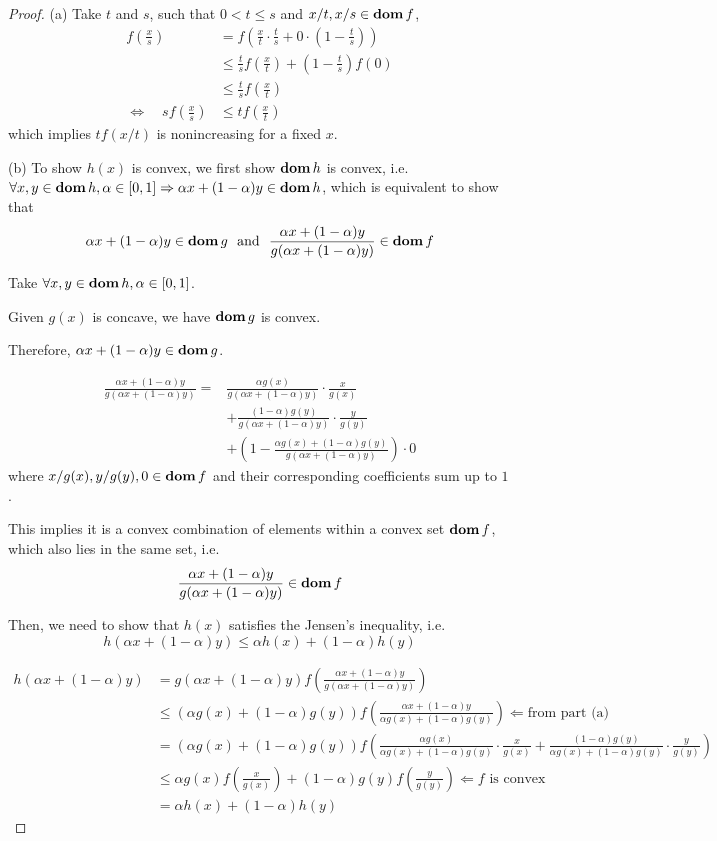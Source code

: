 \documentclass[11pt]{article}
\begin{document}
\begin{proof}
(a) 
Take $t$ and $s$, such that $0<t\leq s$ and $x/t, x/s \in \mathop{\textbf{dom}} f$,
\begin{align*}
    f(\frac{x}{s}) &= f(\frac{x}{t}\cdot\frac{t}{s} + 0\cdot (1-\frac{t}{s}))\\
    & \leq \frac{t}{s}f(\frac{x}{t}) + (1-\frac{t}{s}) f(0)\\
    & \leq \frac{t}{s}f(\frac{x}{t})\\
    \Leftrightarrow \quad
    sf(\frac{x}{s}) & \leq tf(\frac{x}{t})
\end{align*}
which implies $tf(x/t)$ is nonincreasing for a fixed $x$.

(b)
To show $h(x)$ is convex, we first show $\mathop{\textbf{dom}} h$ is convex, i.e. $\forall x, y \in\mathop{\textbf{dom}} h, \alpha \in [0, 1] \Rightarrow \alpha x + (1-\alpha)y \in\mathop{\textbf{dom}} h$, which is equivalent to show that
\[
\alpha x + (1-\alpha) y \in \mathop{\textbf{dom}} g \ \text{ and }\  \frac{\alpha x + (1-\alpha) y}{g(\alpha x + (1-\alpha) y)} \in\mathop{\textbf{dom}} f
\]

Take $\forall x, y \in\mathop{\textbf{dom}} h, \alpha \in [0, 1]$. 

Given $g(x)$ is concave, we have $\mathop{\textbf{dom}} g$ is convex.

Therefore, $\alpha x + (1-\alpha) y \in \mathop{\textbf{dom}} g$.

\begin{align*}
    \frac{\alpha x + (1-\alpha) y}{g(\alpha x + (1-\alpha) y)}
    =& \frac{\alpha g(x)}{g(\alpha x + (1-\alpha) y)} \cdot \frac{x}{g(x)} \\
    &+ \frac{(1-\alpha)g(y)}{g(\alpha x + (1-\alpha) y)}\cdot \frac{y}{g(y)} \\
    &+ (1 - \frac{\alpha g(x) + (1-\alpha)g(y)}{g(\alpha x + (1-\alpha) y)}) \cdot 0
\end{align*}
where $x/g(x), y/g(y), 0\in\mathop{\textbf{dom}} f$ and their corresponding coefficients sum up to $1$.

This implies it is a convex combination of elements within a convex set $\mathop{\textbf{dom}} f$, which also lies in the same set, i.e.
\[
    \frac{\alpha x + (1-\alpha) y}{g(\alpha x + (1-\alpha) y)} \in\mathop{\textbf{dom}} f
\]

Then, we need to show that $h(x)$ satisfies the Jensen's inequality, i.e. 
\[
    h(\alpha x + (1-\alpha) y) \leq \alpha h(x) + (1-\alpha) h(y)
\]

\begin{align*}
    h(\alpha x + (1-\alpha) y) 
    & = g(\alpha x + (1-\alpha) y) f(\frac{\alpha x + (1-\alpha) y}{g(\alpha x + (1-\alpha) y)})\\
    & \leq (\alpha g(x) + (1-\alpha)g(y)) f(\frac{\alpha x + (1-\alpha) y}{\alpha g(x) + (1-\alpha)g(y)}) \Leftarrow  \text{from part (a)}\\
    & = (\alpha g(x) + (1-\alpha)g(y)) f(\frac{\alpha g(x)}{\alpha g(x) + (1-\alpha)g(y)} \cdot \frac{x}{g(x)} + \frac{(1-\alpha) g(y)}{\alpha g(x) + (1-\alpha)g(y)} \cdot \frac{y}{g(y)})\\
    & \leq \alpha g(x) f( \frac{x}{g(x)}) + (1-\alpha) g(y) f(\frac{y}{g(y)}) \Leftarrow \text{$f$ is convex}\\
    & = \alpha h(x) + (1-\alpha) h(y)
\end{align*}


\end{proof}
\end{document}
